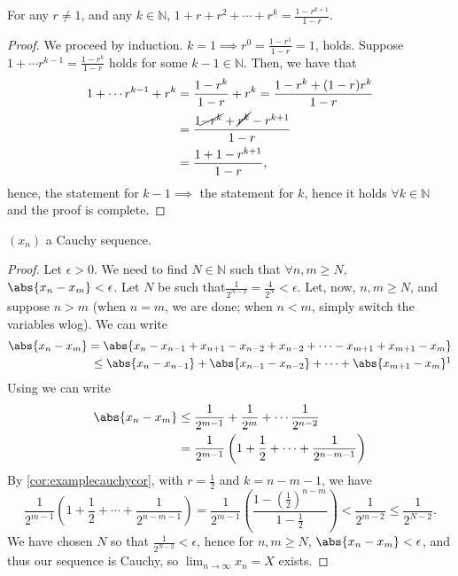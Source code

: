 \documentclass[12pt]{article}
\begin{document}
\begin{corollary}\label{cor:examplecauchycor}
  For any $r \neq 1$, and any $k \in \mathbb{N}$, $1 + r + r^2 + \cdots + r^k = \frac{1-r^{k+1}}{1-r}$.
\end{corollary}
\begin{proof}
  We proceed by induction. $k = 1 \implies r^{0} = \frac{1-r^{1}}{1-r} = 1$, holds. Suppose $1 + \cdots r^{k-1} = \frac{1-r^{k}}{1-r}$ holds for some $k - 1 \in \mathbb{N}$. Then, we have that \begin{align*}
    1 + \cdots r^{k-1} + r^{k} &= \frac{1-r^{k}}{1-r} + r^{k} = \frac{1-r^{k} + (1-r)r^k}{1-r}\\
    &= \frac{1 \cancel{- r^{k}} + \cancel{r^{k}} - r^{k+1}}{1 - r}\\
    &= \frac{1 + 1 - r^{k+1}}{1-r},
  \end{align*}
  hence, the statement for $k-1 \implies$ the statement for $k$, hence it holds $\forall k \in \mathbb{N}$ and the proof is complete.
\end{proof}

\begin{proposition}\label{prop:exercisecauchypropIII}
  $(x_n)$ a Cauchy sequence.
\end{proposition}
\begin{proof}
  Let $\epsilon > 0$. We need to find $N \in \mathbb{N}$ such that $\forall n, m \geq N$, $\abs{x_{n} - x_m} < \epsilon$. Let $N$ be such that\footnotemark $\frac{1}{2^{N-2}} = \frac{4}{2^N} < \epsilon$. Let, now, $n,m \geq N$, and suppose $n > m$ (when $n=m$, we are done; when $n < m$, simply switch the variables wlog). We can write \begin{align*}
    \abs{x_n - x_m} = \abs{x_n - x_{n-1} + x_{n+1} - x_{n-2} + x_{n-2} + \cdots - x_{m+1} + x_{m+1} - x_m}\\
    \leq \abs{x_n - x_{n-1}} + \abs{x_{n-1} - x_{n-2}} + \cdots + \abs{x_{m+1} - x_m} \footnotemark
  \end{align*}
  Using  we can write \begin{align*}
    \abs{x_{n} - x_m} &\leq \frac{1}{2^{m-1}} + \frac{1}{2^m} + \cdots \frac{1}{2^{n-2}}\\
    &= \frac{1}{2^{m-1}}\left(1 + \frac{1}{2} + \cdots + \frac{1}{2^{n-m-1}}\right)
  \end{align*}
  By \cref{cor:examplecauchycor}, with $r = \frac{1}{2}$ and $k = n - m - 1$, we have \[
    \frac{1}{2^{m-1}}\left(1 + \frac{1}{2} + \cdots + \frac{1}{2^{n-m-1}}\right) = \frac{1}{2^{m-1}} \left(
  \frac{1 - \left(\frac{1}{2}\right)^{n-m}}{1 - \frac{1}{2}}
    \right) < \frac{1}{2^{m-2}} \leq \frac{1}{2^{N-2}}.
  \]
  We have chosen $N$ so that $\frac{1}{2^{N-2}} < \epsilon$, hence for $n,m \geq N$, $\abs{x_n - x_m} < \epsilon$, and thus our sequence is Cauchy, so $\lim_{n\to\infty} x_n = X$ exists.
\end{proof}
\end{document}
